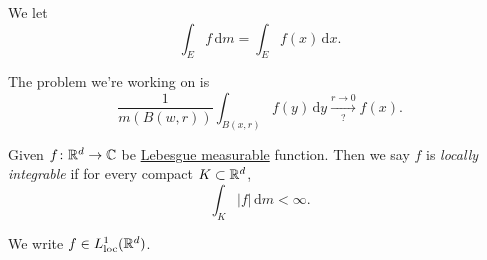 \begin{notation}
  We let
  \[
    \int _E f \,\mathrm{d} m = \int _E f(x) \,\mathrm{d} x.
  \]
\end{notation}

The problem we're working on is
\[
  \frac{1}{m(B(w, r))}\int _{B(x, r)}f(y)\,\mathrm{d} y \overset{r\to 0}{\underset{?}{\longrightarrow}}f(x).
\]
\begin{definition}\label{def:locally-integrable}
  Given \(f\colon \mathbb{\MakeUppercase{r}} ^d \to \mathbb{\MakeUppercase{c}} \) be \hyperref[def:Lebesgue-measurable-function]{Lebesgue measurable}
  function. Then we say \(f\) is \emph{locally integrable} if for every compact \(K\subset \mathbb{\MakeUppercase{r}} ^d\),
  \[
    \int _K \left\vert f \right\vert \,\mathrm{d} m < \infty.
  \]

  We write \(f\in L^1_{\text{loc} }(\mathbb{\MakeUppercase{r}} ^d)\).
\end{definition}


